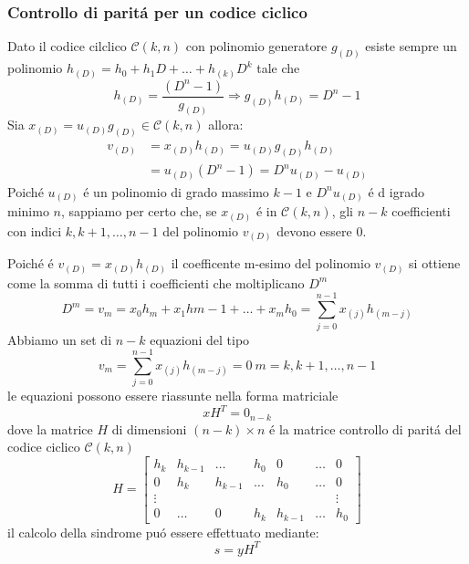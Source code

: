         \subsubsection{Controllo di paritá per un codice ciclico}
            Dato il codice cilclico $\mathcal{C}(k,n)$ con polinomio generatore $g_{(D)}$ esiste sempre un polinomio 
            $h_{(D)} = h_0+h_1D+\dots+h_{(k)}D^k$ tale che 
            \[
                h_{(D)} = \frac{(D^n-1)}{g_{(D)}} \Rightarrow g_{(D)}h_{(D)} = D^n-1    
            \]
            Sia $x_{(D)} = u_{(D)}g_{(D)}\in \mathcal{C}(k,n)$ allora:
            \begin{align}
                v_{(D)} &= x_{(D)}h_{(D)} = u_{(D)}g_{(D)}h_{(D)}\nonumber \\
                        &= u_{(D)}(D^n-1) = D^nu_{(D)}-u_{(D)}\nonumber
            \end{align}
            Poiché $u_{(D)}$ é un polinomio di grado massimo $k-1$ e $D^nu_{(D)}$ é d igrado minimo $n$,
            sappiamo per certo che, se $x_{(D)}$ é in $\mathcal{C}(k,n)$, gli $n-k$ coefficienti con indici
            $k,k+1,\dots,n-1$ del polinomio $v_{(D)}$ devono essere $0$.

            Poiché é $v_{(D)} = x_{(D)}h_{(D)}$ il coefficente m-esimo del polinomio $v_{(D)}$ si 
            ottiene come la somma di tutti i coefficienti che moltiplicano $D^m$
            \[
                D^m = v_m = x_0h_m+x_1h{m-1}+\dots+x_mh_0 = \sum_{j=0}^{n-1}x_{(j)}h_{(m-j)}  
            \] 
            Abbiamo un set di $n-k$ equazioni del tipo 
            \[
                v_m =  \sum_{j=0}^{n-1}x_{(j)}h_{(m-j)} = 0\ m=k,k+1,\dots,n-1  
            \]
            le equazioni possono essere riassunte nella forma matriciale
            \[
                xH^T=0_{n-k}  
            \]
            dove la matrice $H$ di dimensioni $(n-k)\times n$ é la matrice controllo di paritá del codice ciclico $\mathcal{C}(k,n)$ 
            \[
                H = 
                \begin{bmatrix}
                h_k & h_{k-1} & \dots & h_{0} & 0 & \dots & 0\\ 
                0 & h_k & h_{k-1} & \dots & h_{0} & \dots & 0\\ 
                \vdots &  &  &  &  &  & \vdots\\ 
                0 & \dots & 0 & h_{k}& h_{k-1} & \dots  & h_0
                \end{bmatrix}
            \]
            il calcolo della sindrome puó essere effettuato mediante:
            \[
                s = yH^T    
            \]
